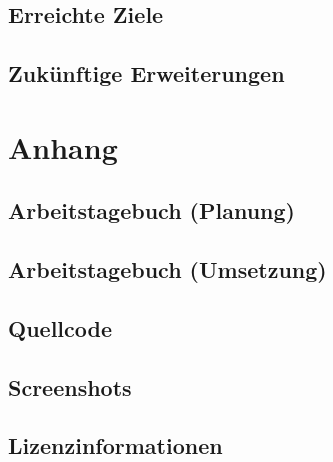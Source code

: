 \documentclass[a4paper]{article}
\begin{document}
\subsection{Erreichte Ziele}

\subsection{Zukünftige Erweiterungen}

\section{Anhang}

\subsection{Arbeitstagebuch (Planung)}

\subsection{Arbeitstagebuch (Umsetzung)}

\subsection{Quellcode}

\subsection{Screenshots}

\subsection{Lizenzinformationen}
\end{document}

